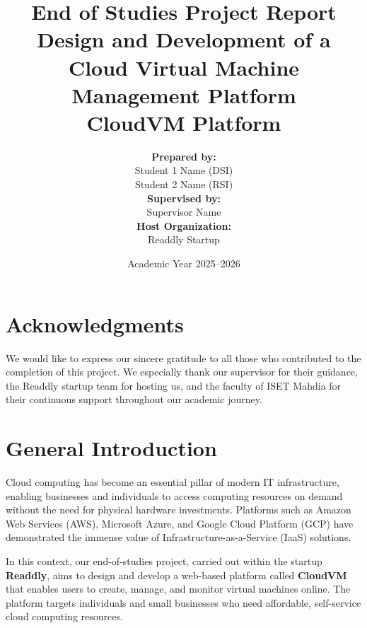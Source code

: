 \documentclass[a4paper, 12pt, oneside]{report}
\title{
  \vspace{-2cm}
  \textbf{End of Studies Project Report}\\[0.5cm]
  \Large Design and Development of a Cloud Virtual Machine Management Platform\\[0.5cm]
  \large CloudVM Platform
}
\author{
  \textbf{Prepared by:}\\
  Student 1 Name (DSI)\\
  Student 2 Name (RSI)\\[1cm]
  \textbf{Supervised by:}\\
  Supervisor Name\\[1cm]
  \textbf{Host Organization:}\\
  Readdly Startup
}
\date{Academic Year 2025--2026}
\begin{document}
\maketitle
\thispagestyle{empty}
\newpage


\chapter*{Acknowledgments}
We would like to express our sincere gratitude to all those who contributed to the completion of this project. We especially thank our supervisor for their guidance, the Readdly startup team for hosting us, and the faculty of ISET Mahdia for their continuous support throughout our academic journey.
\newpage

\tableofcontents
\newpage

\listoffigures
{}
\newpage

\listoftables
{}
\newpage

\chapter*{General Introduction}

Cloud computing has become an essential pillar of modern IT infrastructure, enabling businesses and individuals to access computing resources on demand without the need for physical hardware investments. Platforms such as Amazon Web Services (AWS), Microsoft Azure, and Google Cloud Platform (GCP) have demonstrated the immense value of Infrastructure-as-a-Service (IaaS) solutions.

In this context, our end-of-studies project, carried out within the startup \textbf{Readdly}, aims to design and develop a web-based platform called \textbf{CloudVM} that enables users to create, manage, and monitor virtual machines online. The platform targets individuals and small businesses who need affordable, self-service cloud computing resources.
\end{document}
